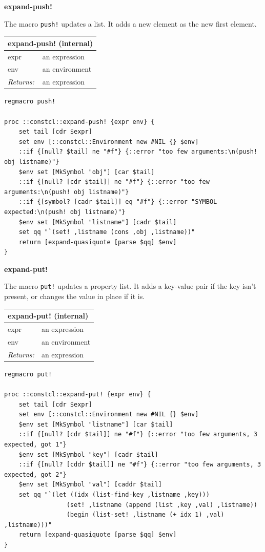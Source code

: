 \documentclass[twoside,9pt]{report}
\begin{document}
\textbf{expand-push!}


The macro \texttt{push!} updates a list. It adds a new element as the new first element.

\begin{tabular}{ |l l| }
\hline
\multicolumn{2}{|l|}{expand-push! (internal)} \\
\hline
expr & an expression \\
env & an environment \\
\textit{Returns:} & an expression \\
\hline
\end{tabular}

\noindent\makebox[\linewidth]{\rule{\linewidth}{0.4pt}}
\begin{lstlisting}
regmacro push!
 
proc ::constcl::expand-push! {expr env} {
    set tail [cdr $expr]
    set env [::constcl::Environment new #NIL {} $env]
    ::if {[null? $tail] ne "#f"} {::error "too few arguments:\n(push! obj listname)"}
    $env set [MkSymbol "obj"] [car $tail]
    ::if {[null? [cdr $tail]] ne "#f"} {::error "too few arguments:\n(push! obj listname)"}
    ::if {[symbol? [cadr $tail]] eq "#f"} {::error "SYMBOL expected:\n(push! obj listname)"}
    $env set [MkSymbol "listname"] [cadr $tail]
    set qq "`(set! ,listname (cons ,obj ,listname))"
    return [expand-quasiquote [parse $qq] $env]
}
\end{lstlisting}
\noindent\makebox[\linewidth]{\rule{\linewidth}{0.4pt}}

\textbf{expand-put!}


The macro \texttt{put!} updates a property list. It adds a key-value pair if the key isn't present, or changes the value in place if it is.

\begin{tabular}{ |l l| }
\hline
\multicolumn{2}{|l|}{expand-put! (internal)} \\
\hline
expr & an expression \\
env & an environment \\
\textit{Returns:} & an expression \\
\hline
\end{tabular}

\noindent\makebox[\linewidth]{\rule{\linewidth}{0.4pt}}
\begin{lstlisting}
regmacro put!
 
proc ::constcl::expand-put! {expr env} {
    set tail [cdr $expr]
    set env [::constcl::Environment new #NIL {} $env]
    $env set [MkSymbol "listname"] [car $tail]
    ::if {[null? [cdr $tail]] ne "#f"} {::error "too few arguments, 3 expected, got 1"}
    $env set [MkSymbol "key"] [cadr $tail]
    ::if {[null? [cddr $tail]] ne "#f"} {::error "too few arguments, 3 expected, got 2"}
    $env set [MkSymbol "val"] [caddr $tail]
    set qq "`(let ((idx (list-find-key ,listname ,key)))
                 (set! ,listname (append (list ,key ,val) ,listname))
                 (begin (list-set! ,listname (+ idx 1) ,val) ,listname)))"
    return [expand-quasiquote [parse $qq] $env]
}
\end{lstlisting}
\noindent\makebox[\linewidth]{\rule{\linewidth}{0.4pt}}
\end{document}
